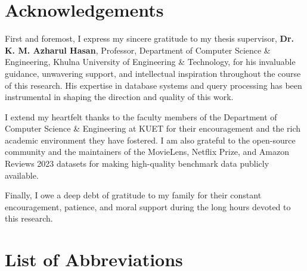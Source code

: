 \documentclass[
  12pt,
  english,
  oneside,
]{report}
\newcommand{\supname}{Dr. K. M. Azharul Hasan}
\newcommand{\supdesig}{Professor}
\newcommand{\deptname}{Department of Computer Science \& Engineering}
\newcommand{\univname}{Khulna University of Engineering \& Technology}
\begin{document}
\chapter*{Acknowledgements}

First and foremost, I express my sincere gratitude to my thesis supervisor, \textbf{\supname}, \supdesig, \deptname, \univname, for his invaluable guidance, unwavering support, and intellectual inspiration throughout the course of this research. His expertise in database systems and query processing has been instrumental in shaping the direction and quality of this work.

I extend my heartfelt thanks to the faculty members of the Department of Computer Science \& Engineering at KUET for their encouragement and the rich academic environment they have fostered. I am also grateful to the open-source community and the maintainers of the MovieLens, Netflix Prize, and Amazon Reviews 2023 datasets for making high-quality benchmark data publicly available.

Finally, I owe a deep debt of gratitude to my family for their constant encouragement, patience, and moral support during the long hours devoted to this research.

\tableofcontents
\listoffigures
\listoftables

\chapter*{List of Abbreviations}
\end{document}
